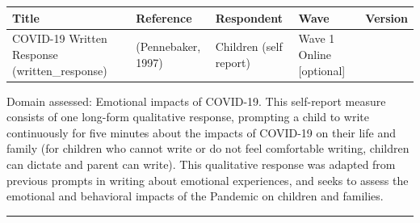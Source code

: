 \documentclass[]{book}
\begin{document}
\begin{longtable}[]{@{}lllll@{}}
\toprule
\begin{minipage}[b]{0.23\columnwidth}\raggedright
Title\strut
\end{minipage} & \begin{minipage}[b]{0.20\columnwidth}\raggedright
Reference\strut
\end{minipage} & \begin{minipage}[b]{0.21\columnwidth}\raggedright
Respondent\strut
\end{minipage} & \begin{minipage}[b]{0.08\columnwidth}\raggedright
Wave\strut
\end{minipage} & \begin{minipage}[b]{0.14\columnwidth}\raggedright
Version\strut
\end{minipage}\tabularnewline
\midrule
\endhead
\begin{minipage}[t]{0.23\columnwidth}\raggedright
COVID-19 Written Response (written\_response)\strut
\end{minipage} & \begin{minipage}[t]{0.20\columnwidth}\raggedright
(Pennebaker, 1997)\strut
\end{minipage} & \begin{minipage}[t]{0.21\columnwidth}\raggedright
Children (self report)\strut
\end{minipage} & \begin{minipage}[t]{0.08\columnwidth}\raggedright
Wave 1 Online {[}optional{]}\strut
\end{minipage} & \begin{minipage}[t]{0.14\columnwidth}\raggedright
\strut
\end{minipage}\tabularnewline
\bottomrule
\end{longtable}

Domain assessed: Emotional impacts of COVID-19. This self-report measure consists of one long-form qualitative response, prompting a child to write continuously for five minutes about the impacts of COVID-19 on their life and family (for children who cannot write or do not feel comfortable writing, children can dictate and parent can write). This qualitative response was adapted from previous prompts in writing about emotional experiences, and seeks to assess the emotional and behavioral impacts of the Pandemic on children and families.

\begin{center}\rule{0.5\linewidth}{0.5pt}\end{center}
\end{document}
